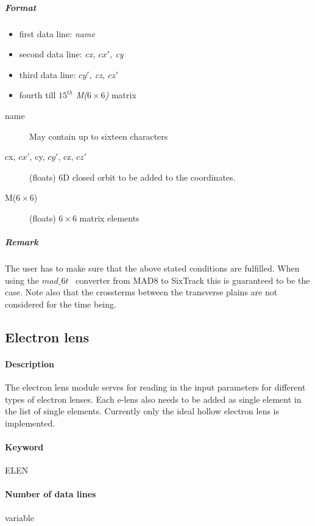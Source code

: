 \documentclass[a4paper,11pt]{report}
\begin{document}
\subparagraph{Format} 
\begin{itemize}
\item first data line: {\em name}
\item second data line: {\em cx, $cx'$, cy}
\item third data line: {\em $cy'$, cz, $cz'$}
\item fourth till $15^{th}$ {\em M($ 6 \times 6$)} matrix 
\end{itemize}

\begin{description}
\item [name] May contain up to sixteen characters
\item [cx, $cx'$, cy, $cy'$, cz, $cz'$] (floats) 6D closed orbit to be added
  to the coordinates.
\item [M($ 6 \times 6$)] (floats) $ 6 \times 6$ matrix elements
\end{description}

\subparagraph{Remark} The user has to make sure that the above stated
conditions are fulfilled. When using the $mad\_6t$~\cite{CONVERTOR}
converter from MAD8 to SixTrack this is guaranteed to be the case. Note
also that the crossterms between the transverse plains are not
considered for the time being.

\subsection{Electron lens} \label{sec:elen}

\paragraph{Description} The electron lens module serves for reading in the input parameters for different types of electron lenses. Each e-lens also needs to be added as single element in the list of single elements. Currently only the ideal hollow electron lens is implemented.

\paragraph{Keyword} ELEN

\paragraph{Number of data lines} variable
\end{document}
